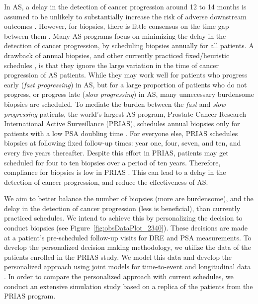 In AS, a delay in the detection of cancer progression around 12 to 14 months is assumed to be unlikely to substantially increase the risk of adverse downstream outcomes \cite{inoue2018comparative,carvalho}. However, for biopsies, there is little consensus on the time gap between them \cite{loeb2014heterogeneity,bruinsma2016active,nieboer2018active}. Many AS programs focus on minimizing the delay in the detection of cancer progression, by scheduling biopsies annually for all patients. A drawback of annual biopsies, and other currently practiced fixed/heuristic schedules \cite{loeb2014heterogeneity,bruinsma2016active,nieboer2018active}, is that they ignore the large variation in the time of cancer progression of AS patients. While they may work well for patients who progress early (\textit{fast progressing}) in AS, but for a large proportion of patients who do not progress, or progress late (\textit{slow progressing}) in AS, many unnecessary burdensome biopsies are scheduled. To mediate the burden between the \textit{fast} and \textit{slow progressing} patients, the world's largest AS program, Prostate Cancer Research International Active Surveillance\cite{bokhorst2016decade} (PRIAS), schedules annual biopsies only for patients with a low PSA doubling time \cite{bokhorst2015compliance}. For everyone else, PRIAS schedules biopsies at following fixed follow-up times: year one, four, seven, and ten, and every five years thereafter. Despite this effort in PRIAS, patients may get scheduled for four to ten biopsies over a period of ten years. Therefore, compliance for biopsies is low in PRIAS \cite{bokhorst2015compliance}. This can lead to a delay in the detection of cancer progression, and reduce the effectiveness of AS.


We aim to better balance the number of biopsies (more are burdensome), and the delay in the detection of cancer progression (less is beneficial), than currently practiced schedules. We intend to achieve this by personalizing the decision to conduct biopsies (see Figure~\ref{fig:obsDataPlot_2340}). These decisions are made at a patient's pre-scheduled follow-up visits for DRE and PSA measurements. To develop the personalized decision making methodology, we utilize the data of the patients enrolled in the PRIAS study. We model this data and develop the personalized approach using joint models for time-to-event and longitudinal data \cite{tsiatis2004joint,rizopoulos2012joint}. In order to compare the personalized approach with current schedules, we conduct an extensive simulation study based on a replica of the patients from the PRIAS program. 

